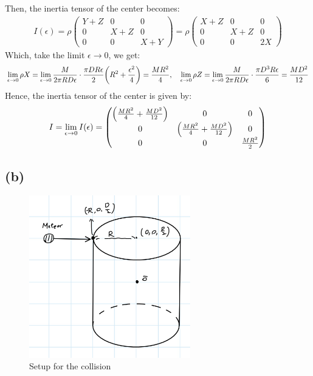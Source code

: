 \documentclass{article}
\DeclarePairedDelimiter{\paran}{(}{)}%
\begin{document}
Then, the inertia tensor of the center becomes:
\begin{align}
    I(\epsilon)=\rho\begin{pmatrix}
        Y+Z&0&0\\
        0&X+Z&0\\
        0&0&X+Y
    \end{pmatrix}=\rho\begin{pmatrix}
        X+Z&0&0\\
        0&X+Z&0\\
        0&0&2X
    \end{pmatrix}
\end{align}
Which, take the limit $\epsilon\rightarrow 0$, we get:
\begin{align}
    \lim_{\epsilon\rightarrow 0}\rho X=\lim_{\epsilon\rightarrow 0}\frac{M}{2\pi RD\epsilon}\cdot \frac{\pi DR\epsilon}{2}\paran*{R^2+\frac{\epsilon^2}{4}}=\frac{MR^2}{4},\quad \lim_{\epsilon\rightarrow 0}\rho Z=\lim_{\epsilon\rightarrow 0}\frac{M}{2\pi RD\epsilon}\cdot\frac{\pi D^3R\epsilon}{6}=\frac{MD^2}{12}
\end{align}
Hence, the inertia tensor of the center is given by:
\begin{align}
    I = \lim_{\epsilon\rightarrow 0}I(\epsilon) = \begin{pmatrix}
        \paran*{\frac{MR^2}{4}+\frac{MD^2}{12}}&0&0\\
        0&\paran*{\frac{MR^2}{4}+\frac{MD^2}{12}}&0\\
        0&0& \frac{MR^2}{2}
    \end{pmatrix}
\end{align}

\subsection*{(b)}
\begin{figure}[h!]
    \begin{center}
        \includegraphics[width=70mm]{phys103_q5b.jpg}
        \caption{Setup for the collision}
    \end{center}
\end{figure}
\end{document}
